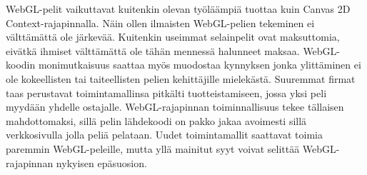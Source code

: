 WebGL-pelit vaikuttavat kuitenkin olevan työläämpiä tuottaa kuin Canvas 2D Context-rajapinnalla. Näin ollen ilmaisten WebGL-pelien tekeminen ei välttämättä ole järkevää. Kuitenkin useimmat selainpelit ovat maksuttomia, eivätkä ihmiset välttämättä ole tähän mennessä halunneet maksaa. WebGL-koodin monimutkaisuus saattaa myös muodostaa kynnyksen jonka ylittäminen ei ole kokeellisten tai taiteellisten pelien kehittäjille mielekästä. Suuremmat firmat taas perustavat toimintamallinsa pitkälti tuotteistamiseen, jossa yksi peli myydään yhdelle ostajalle. WebGL-rajapinnan toiminnallisuus tekee tällaisen mahdottomaksi, sillä pelin lähdekoodi on pakko jakaa avoimesti sillä verkkosivulla jolla peliä pelataan. Uudet toimintamallit saattavat toimia paremmin WebGL-peleille, mutta yllä mainitut syyt voivat selittää WebGL-rajapinnan nykyisen epäsuosion.